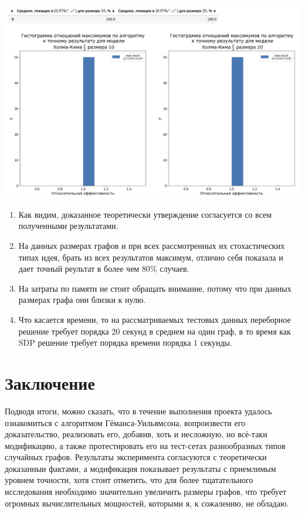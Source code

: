 \documentclass[12pt, a4paper]{article}
\begin{document}
\includegraphics[width=1\textwidth]{images/9.png}

\begin{enumerate}
    \item Как видим, доказанное теоретически утверждение согласуется со всем полученными результатами.
    \item На данных размерах графов и при всех рассмотренных их стохастических типах идея, брать из всех результатов максимум, отлично себя показала и дает точный реультат в более чем $80\%$ случаев.
    \item На затраты по памяти не стоит обращать внимание, потому что при данных размерах графа они близки к нулю.
    \item Что касается времени, то на рассматриваемых тестовых данных переборное решение требует порядка $20$ секунд в среднем на один граф, в то время как SDP решение требует порядка времени порядка $1$ секунды.
\end{enumerate}

\section{Заключение}
Подводя итоги, можно сказать, что в течение выполнения проекта удалось ознакомиться с алгоритмом Гёманса-Уильямсона, вопроизвести его доказательство, реализовать его, добавив, хоть и несложную, но всё-таки модификацию, а также протестировать его на тест-сетах разнообразных типов случайных графов. Результаты эксперимента согласуются с теоретически доказанныи фактами, а модификация показывает результаты с приемлимым уровнем точности, хотя стоит отметить, что для более тщатательного исследования необходимо значительно увеличить размеры графов, что требует огромных вычислительных мощностей, которыми я, к сожалению, не обладаю.
\end{document}

